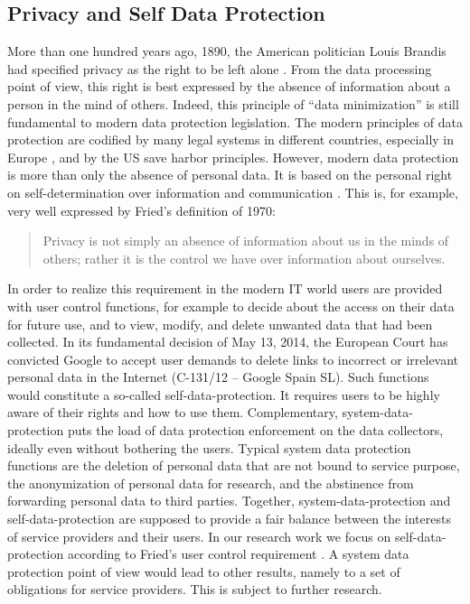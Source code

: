 \documentclass[runningheads,a4paper]{llncs}
\begin{document}
\subsection{Privacy and Self Data Protection}
More than one hundred years ago, 1890, the American politician Louis Brandis had specified privacy as the right to be left alone \cite{WarrenBrandeis:RightToPrivacy}. From the data processing point of view, this right is best expressed by the absence of information about a person in the mind of others. Indeed, this principle of “data minimization” is still fundamental to modern data protection legislation. The modern principles of data protection are codified by many legal systems in different countries, especially in Europe \cite{EU-directive2}, and by the US save harbor principles. However, modern data protection is more than only the absence of personal data. It is based on the personal right on self-determination over information and communication \cite{BVerfG:census}. This is, for example, very well expressed by Fried’s definition of 1970:
\begin{quote}
	Privacy is not simply an absence of information about us in the minds of others; rather it is the control we have over information about ourselves. \cite{CFried:Privacy}
\end{quote}
In order to realize this requirement in the modern IT world users are provided with user control functions, for example to decide about the access on their data for future use, and to view, modify, and delete unwanted data that had been collected. In its fundamental decision of May 13, 2014, the European Court has convicted Google to accept user demands to delete links to incorrect or irrelevant personal data in the Internet (C-131/12 – Google Spain SL). Such functions would constitute a so-called self-data-protection. It requires users to be highly aware of their rights and how to use them. Complementary, system-data-protection puts the load of data protection enforcement on the data collectors, ideally even without bothering the users. Typical system data protection functions are the deletion of personal data that are not bound to service purpose, the anonymization of personal data for research, and the abstinence from forwarding personal data to third parties. Together, system-data-protection and self-data-protection are supposed to provide a fair balance between the interests of service providers and their users.
In our research work we focus on self-data-protection according to Fried’s user control requirement \cite{CFried:Privacy}. A system data protection point of view would lead to other results, namely to a set of obligations for service providers. This is subject to further research.
\end{document}
